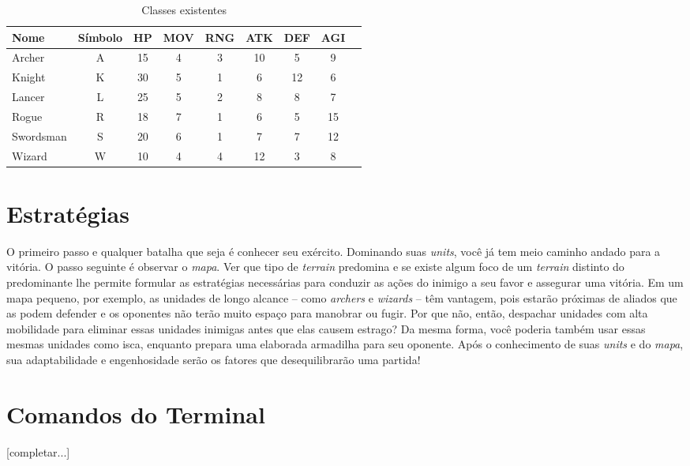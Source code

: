 \documentclass{article}
\begin{document}
\begin{table}[H]
\centering
\begin{tabular}{|l|c|c|c|c|c|c|c|c|}\hline
 \textbf{Nome} & \textbf{Símbolo} & \textbf{HP} & \textbf{MOV} & \textbf{RNG} & \textbf{ATK} & \textbf{DEF} & \textbf{AGI}\\\hline
Archer    & A & 15 & 4 & 3 & 10 &  5 &  9 \\\hline
Knight    & K & 30 & 5 & 1 &  6 & 12 &  6 \\\hline
Lancer    & L & 25 & 5 & 2 &  8 &  8 &  7 \\\hline
Rogue     & R & 18 & 7 & 1 &  6 &  5 & 15 \\\hline
Swordsman & S & 20 & 6 & 1 &  7 &  7 & 12 \\\hline
Wizard    & W & 10 & 4 & 4 & 12 &  3 &  8 \\\hline
\end{tabular}
\caption{Classes existentes}
\end{table}

\section{Estratégias}
O primeiro passo e qualquer batalha que seja é conhecer seu exército. Dominando suas \emph{units}, você já tem meio caminho andado para a vitória. O passo seguinte é observar o \emph{mapa}. Ver que tipo de \emph{terrain} predomina e se existe algum foco de um \emph{terrain} distinto do predominante lhe permite formular as estratégias necessárias para conduzir as ações do inimigo a seu favor e assegurar uma vitória. Em um mapa pequeno, por exemplo, as unidades de longo alcance -- como \emph{archers} e \emph{wizards} -- têm vantagem, pois estarão próximas de aliados que as podem defender e os oponentes não terão muito espaço para manobrar ou fugir. Por que não, então, despachar unidades com alta mobilidade para eliminar essas unidades inimigas antes que elas causem estrago? Da mesma forma, você poderia também usar essas mesmas unidades como isca, enquanto prepara uma elaborada armadilha para seu oponente. Após o conhecimento de suas \emph{units} e do \emph{mapa}, sua adaptabilidade e engenhosidade serão os fatores que desequilibrarão uma partida!

\section{Comandos do Terminal}
[completar...]
\end{document}
